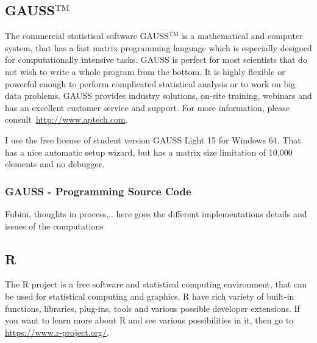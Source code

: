 \documentclass[a4paper,11pt,english]{article}
\begin{document}
			\subsection{GAUSS$^\text{TM}$} 
			
			The commercial statistical software GAUSS$^\text{TM}$ is a mathematical and computer system, that has a fast matrix programming language which 
			is especially designed for computationally intensive tasks. GAUSS is perfect for most scientists that do not wish to write a whole program 
			from the bottom. It is highly flexible or powerful enough to perform complicated statistical analysis or to work on big data problems. GAUSS 
			provides industry solutions, on-site training, webinars and has an excellent customer service and support. For more information, please 
			consult~\url{http://www.aptech.com}. 
			
			I use the free license of student version GAUSS Light 15 for Windows 64. That has a nice automatic setup wizard, but has a matrix size
			limitation of 10,000 elements and no debugger.


				\subsubsection{GAUSS - Programming Source Code} 
				
				Fubini, thoughts in process,.. here goes the different implementations details and issues of the computations
				
			\subsection{R} 
			
			The R project is a free software and statistical computing environment, that can be used for statistical computing and graphics. 
			R have rich variety of built-in functions, libraries, plug-ins, tools and various possible developer extensions. If you want to learn more 
			about R and see various possibilities in it, then go to \url{https://www.r-project.org/}.
\end{document}
